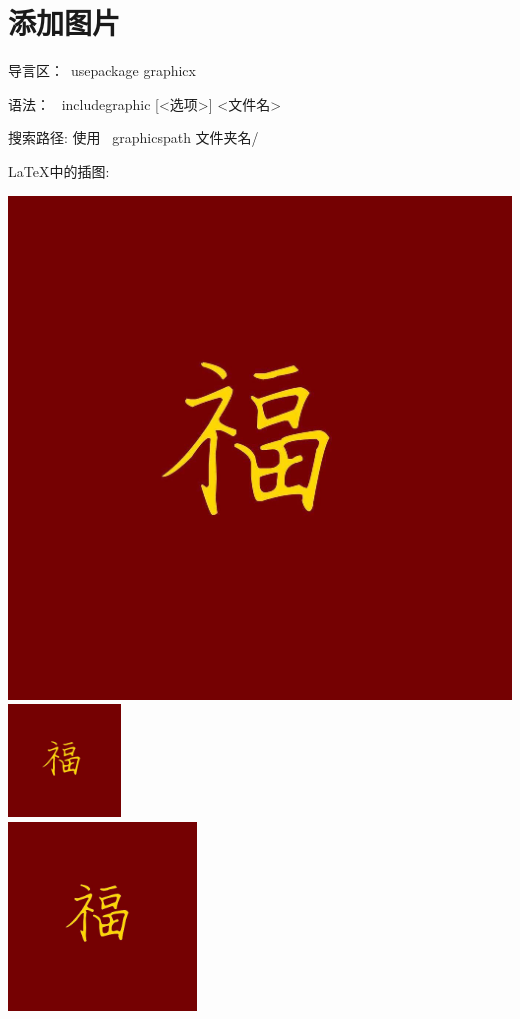 \documentclass[UTF8]{article}
\date{\today}
\begin{document}
	\section{添加图片}
	导言区：\ usepackage {graphicx}
	
	语法： \ includegraphic [<选项>] {<文件名>}
	
	搜索路径:  使用 \ graphicspath {{文件夹名/ } }
	
	\LaTeX{}中的插图:
	
\begin{center}
	\includegraphics[scale=0.3]{fu}\\
	\includegraphics[height=3cm]{fu}\\
	\includegraphics[width=5cm]{fu}\\

\end{center}
\end{document}
